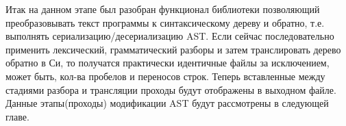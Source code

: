 

Итак на данном этапе был разобран функционал библиотеки позволяющий преобразовывать текст программы к синтаксическому дереву и обратно, 
т.е. выполнять сериализацию/десериализацию AST. Если сейчас последовательно применить лексический, грамматический разборы и затем транслировать дерево обратно в Си, то 
получатся практически идентичные файлы за исключением, может быть, кол-ва пробелов и переносов строк. 
Теперь вставленные между стадиями разбора и трансляции проходы будут отображены в выходном файле.
Данные этапы(проходы) модификации AST будут рассмотрены в следующей главе.